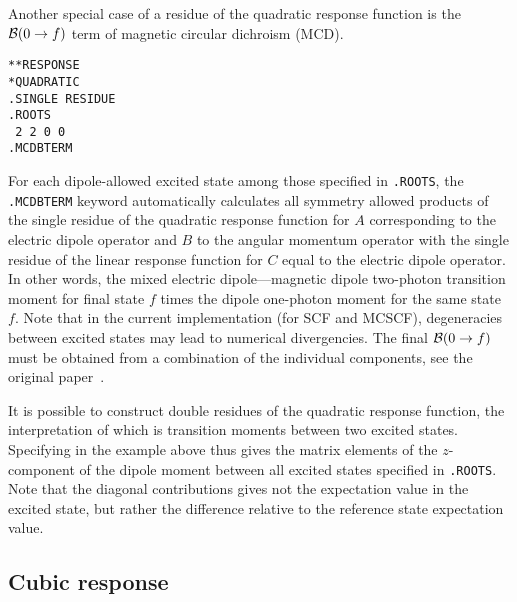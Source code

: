 Another special case of a residue of the quadratic response function 
is the ${\cal{B}}(0\to f)$ term of magnetic circular dichroism (MCD).
\begin{verbatim}
**RESPONSE
*QUADRATIC
.SINGLE RESIDUE
.ROOTS
 2 2 0 0
.MCDBTERM
\end{verbatim}
For each dipole-allowed excited state among those specified in 
{\tt .ROOTS}, the {\tt .MCDBTERM} keyword automatically 
calculates all symmetry allowed products of the single residue of the 
quadratic response function for $A$ corresponding to the electric dipole
operator and $B$ to the angular momentum operator with the single residue 
of the linear response function for $C$ equal to the electric dipole operator.
In other words, the mixed electric dipole---magnetic dipole two-photon
transition moment
for final state $f$ times the dipole one-photon moment for the same state $f$.
Note that in the current implementation (for SCF and MCSCF), degeneracies between
excited states may lead to numerical divergencies. 
The final ${\cal{B}}(0\to f)$ must be obtained from a combination 
of the individual components, see the original paper~\cite{Coriani:MCDRSP}.

It is possible to construct double
residues of the quadratic
response function, the interpretation of which is transition
moments
between two 
excited states. Specifying  in the example above thus gives
the matrix elements of the $z$-component of the dipole moment between
all excited states specified in {\tt .ROOTS}. Note that the diagonal contributions
gives  not the expectation value in the excited state, but rather the
difference relative to the reference state expectation value.

\subsection{Cubic response}
\label{subsec:cubrsp}

\begin{center}
\end{center}

